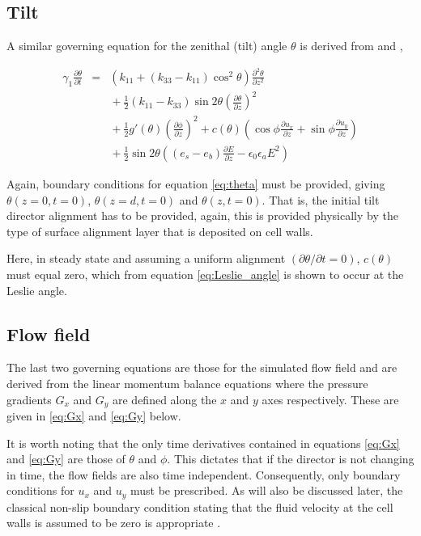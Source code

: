 \subsection{Tilt}
A similar governing equation for the zenithal (tilt) angle $\theta$ is derived from \cite{Cornford2008} and \cite{Stewart2004},

\begin{eqnarray}
\nonumber \gamma_1\frac{\partial\theta}{\partial t} & = & \left(k_{11}+\left(k_{33}-k_{11}\right)\cos^2\theta\right)\frac{\partial^2\theta}{\partial z^2}\\
\nonumber	& & {} + \frac{1}{2}\left(k_{11}-k_{33}\right)\sin2\theta\left(\frac{\partial\theta}{\partial z}\right)^2\\
\nonumber	& & {} + \frac{1}{2}g'\left(\theta\right)\left(\frac{\partial\phi}{\partial z}\right)^2+c\left(\theta\right)\left(\cos\phi\frac{\partial 							u_x}{\partial z}+\sin\phi\frac{\partial u_y}{\partial z}\right)\\
	& & {} + \frac{1}{2}\sin2\theta\left(\left(e_s-e_b\right)\frac{\partial E}{\partial z}-\epsilon_0\epsilon_aE^2\right)
	\label{eq:theta}
\end{eqnarray}

Again, boundary conditions for equation \ref{eq:theta} must be provided, giving $\theta\left(z=0,t=0\right)$, $\theta\left(z=d,t=0\right)$ and $\theta\left(z,t=0\right)$. That is, the initial tilt director alignment has to be provided, again, this is provided physically by the type of surface alignment layer that is deposited on cell walls.

Here, in steady state and assuming a uniform alignment $\left(\partial\theta / \partial t=0\right)$, $c\left(\theta\right)$ must equal zero, which from equation \ref{eq:Leslie_angle} is shown to occur at the Leslie angle.

\subsection{Flow field}
The last two governing equations are those for the simulated flow field and are derived from the linear momentum balance equations \cite{Cornford2008} where the pressure gradients $G_x$ and $G_y$ are defined along the $x$ and $y$ axes respectively. These are given in \ref{eq:Gx} and \ref{eq:Gy} below.

It is worth noting that the only time derivatives contained in equations \ref{eq:Gx} and \ref{eq:Gy} are those of $\theta$ and $\phi$. This dictates that if the director is not changing in time, the flow fields are also time independent. 
Consequently, only boundary conditions for $u_x$ and $u_y$ must be prescribed. As will also be discussed later, the classical non-slip boundary condition stating that the fluid velocity at the cell walls is assumed to be zero is appropriate \cite{Cornford2008,Feynmann1964}.

